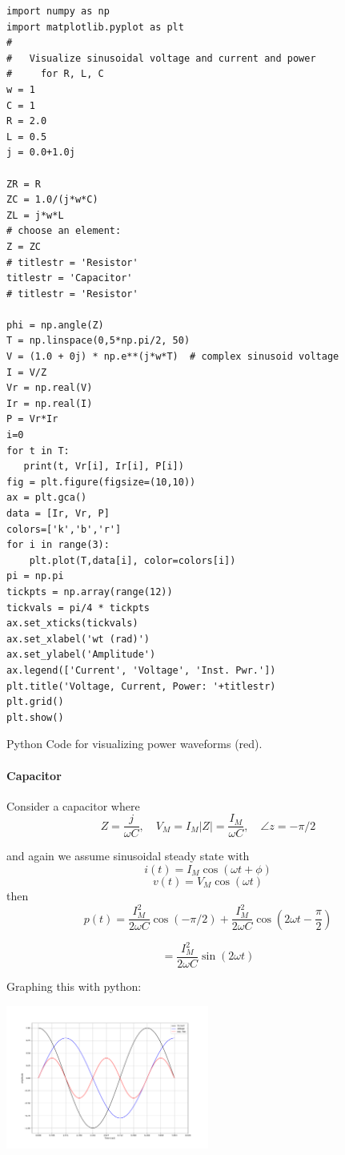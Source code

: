 \begin{listing}
\begin{verbatim}
import numpy as np
import matplotlib.pyplot as plt
#
#   Visualize sinusoidal voltage and current and power
#     for R, L, C
w = 1
C = 1
R = 2.0
L = 0.5
j = 0.0+1.0j

ZR = R
ZC = 1.0/(j*w*C)
ZL = j*w*L
# choose an element:
Z = ZC
# titlestr = 'Resistor'
titlestr = 'Capacitor'
# titlestr = 'Resistor'

phi = np.angle(Z)
T = np.linspace(0,5*np.pi/2, 50)
V = (1.0 + 0j) * np.e**(j*w*T)  # complex sinusoid voltage
I = V/Z
Vr = np.real(V)
Ir = np.real(I)
P = Vr*Ir
i=0
for t in T:
   print(t, Vr[i], Ir[i], P[i])
fig = plt.figure(figsize=(10,10))
ax = plt.gca()
data = [Ir, Vr, P]
colors=['k','b','r']
for i in range(3):
    plt.plot(T,data[i], color=colors[i])
pi = np.pi
tickpts = np.array(range(12))
tickvals = pi/4 * tickpts
ax.set_xticks(tickvals)
ax.set_xlabel('wt (rad)')
ax.set_ylabel('Amplitude')
ax.legend(['Current', 'Voltage', 'Inst. Pwr.'])
plt.title('Voltage, Current, Power: '+titlestr)
plt.grid()
plt.show()
\end{verbatim}
\caption{Python Code for visualizing power waveforms (red).}
\label{lst:basicTustin}
\end{listing}


\paragraph{Capacitor}
Consider a capacitor where
\[
Z = \frac{j}{\omega C}, \quad V_M = I_M |Z| = \frac{I_M}{\omega C}, \quad \angle z = -\pi/2
\]

and again we assume
sinusoidal steady state with
\[
i(t) = I_M \cos(\omega t + \phi)
\]
\[
v(t) = V_M \cos(\omega t)
\]
then
\[
p(t) = \frac{I_M^2}{2\omega C} \cos(-\pi/2) + \frac{I_M^2}{2\omega C} \cos(2\omega t  - \frac{\pi}{2})
\]

\[
= \frac{I_M^2}{2\omega C} \sin(2\omega t  )
\]

Graphing this with python:

\includegraphics[width=0.5\textwidth]{figsChapt03/US73216.png}  %

